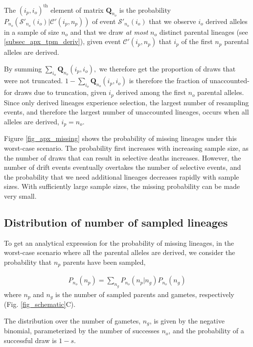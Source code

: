 \documentclass[review]{elsarticle}
\newcommand{\ms}{\mathcal{S}}
\begin{document}
The $(i_p,i_o)^\text{th}$ element of matrix $\mathbf{Q}_{n_o}$ is the probability
$P_{n_o}(\mathcal{S'}_{n_o} (i_o)| \mathcal{C'}(i_p,n_p))$ of event $\ms'_{n_o}(i_o)$ that we observe $i_o$ derived alleles in
a sample of size $n_o$ and that we draw \emph{at most} $n_o$ distinct parental lineages (see \ref{subsec_apx_tpm_deriv}), 
given event $\mathcal{C'}(i_p,n_p)$ that $i_p$ of the first $n_p$ parental alleles are derived.

By summing $\sum_{i_o} \mathbf{Q}_{n_o}(i_p, i_o),$ we therefore get the proportion of draws that
were not truncated. $1-\sum_{i_o} \mathbf{Q}_{n_o}(i_p, i_o)$ is therefore the fraction of
unaccounted-for draws due to truncation, given $i_p$ derived among the first $n_o$ parental
alleles. Since only derived lineages experience selection, the largest number of resampling events,
and therefore the largest number of unaccounted lineages, occurs when all alleles are derived,
$i_p = n_o$.

Figure \ref{fig_apx_missing} shows the probability of missing lineages under this worst-case scenario. The 
probability first increases with increasing sample size, as the number of draws that can
result in selective deaths increases. However, the number of drift events eventually overtakes the
number of selective events, and the probability that we need additional lineages decreases rapidly
with sample sizes. With sufficiently large sample sizes, the missing probability can be made very small.

\subsection{Distribution of number of sampled lineages}
\label{subsec_distribution}

To get an analytical expression for the probability of missing lineages, in the worst-case scenario
where all the parental alleles are derived, we consider the probability that $n_p$ parents have been
sampled,

\begin{equation}
  \begin{aligned}
    \label{eq_conditional}
    P_{n_o}(n_p) = \sum_{n_g} P_{n_o}(n_p | n_g)P_{n_o}(n_g) 
  \end{aligned}
\end{equation}
where $n_p$ and $n_g$ is the number of sampled parents and gametes, respectively (Fig.
\ref{fig_schematic}C). 

The distribution over the number of gametes, $n_g$, is given by the negative binomial,
parameterized by the number of successes $n_o$, and the probability of a successful draw is $1-s$.
\end{document}
